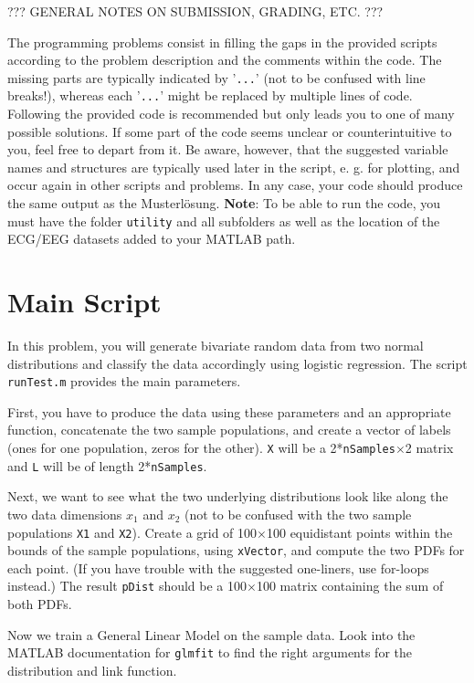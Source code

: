 \documentclass[10pt,a4paper,notitlepage]{report}
\begin{document}
??? GENERAL NOTES ON SUBMISSION, GRADING, ETC. ???

The programming problems consist in filling the gaps in the provided scripts according to the problem description and the comments within the code. The missing parts are typically indicated by '\texttt{...}' (not to be confused with line breaks!), whereas each '\texttt{...}' might be replaced by multiple lines of code. Following the provided code is recommended but only leads you to one of many possible solutions. If some part of the code seems unclear or counterintuitive to you, feel free to depart from it. Be aware, however, that the suggested variable names and structures are typically used later in the script, e. g. for plotting, and occur again in other scripts and problems. In any case, your code should produce the same output as the Musterlösung. \textbf{Note}: To be able to run the code, you must have the folder \texttt{utility} and all subfolders as well as the location of the ECG/EEG datasets added to your MATLAB path.

\section*{Main Script}
In this problem, you will generate bivariate random data from two normal distributions and classify the data accordingly using logistic regression. The script \texttt{runTest.m} provides the main parameters.

First, you have to produce the data using these parameters and an appropriate function, concatenate the two sample populations, and create a vector of labels (ones for one population, zeros for the other). \texttt{X} will be a 2*\texttt{nSamples}$\times$2 matrix and \texttt{L} will be of length 2*\texttt{nSamples}.

Next, we want to see what the two underlying distributions look like along the two data dimensions $x_1$ and $x_2$ (not to be confused with the two sample populations \texttt{X1} and \texttt{X2}). Create a grid of 100$\times$100 equidistant points within the bounds of the sample populations, using \texttt{xVector}, and compute the two PDFs for each point. (If you have trouble with the suggested one-liners, use for-loops instead.) The result \texttt{pDist} should be a 100$\times$100 matrix containing the sum of both PDFs.

Now we train a General Linear Model on the sample data. Look into the MATLAB documentation for \texttt{glmfit} to find the right arguments for the distribution and link function.
\end{document}
